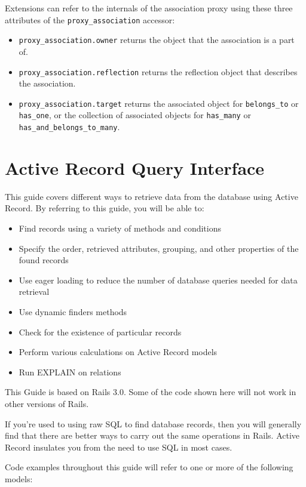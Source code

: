 \documentclass[10pt]{book}
\begin{document}
Extensions can refer to the internals of the association proxy using these three attributes of the \texttt{proxy\_association} accessor:
\begin{itemize}
	\item \texttt{proxy\_association.owner} returns the object that the association is a part of.
	\item \texttt{proxy\_association.reflection} returns the reflection object that describes the association.
	\item \texttt{proxy\_association.target} returns the associated object for \texttt{belongs\_to} or \texttt{has\_one}, or the collection of associated objects for \texttt{has\_many} or \texttt{has\_and\_belongs\_to\_many}.
\end{itemize}

\chapter{Active Record Query Interface}

This guide covers different ways to retrieve data from the database  using Active Record. By referring to this guide, you will be able to:
\begin{itemize}
	\item Find records using a variety of methods and conditions
	\item Specify the order, retrieved attributes, grouping, and other properties of the found records
	\item Use eager loading to reduce the number of database queries needed for data retrieval
	\item Use dynamic finders methods
	\item Check for the existence of particular records
	\item Perform various calculations on Active Record models
	\item Run EXPLAIN on relations
\end{itemize}

This Guide is based on Rails 3.0. Some of the code shown here will not work in other versions of Rails.

If you’re used to using raw SQL to find  database records, then you will generally find that there are better  ways to carry out the same operations in Rails. Active Record insulates  you from the need to use SQL in most cases.

Code examples throughout this guide will refer to one or more of the following models:
\end{document}
